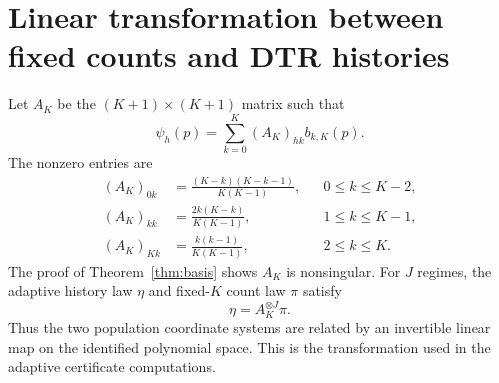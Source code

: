 \documentclass[11pt]{article}
\theoremstyle{remark}
\begin{document}
\appendix
\section{Linear transformation between fixed counts and DTR histories}

Let $A_K$ be the $(K+1)\times(K+1)$ matrix such that
\[
 \psi_h(p)=\sum_{k=0}^K (A_K)_{hk}b_{k,K}(p).
\]
The nonzero entries are
\begin{align*}
(A_K)_{0k}&=\frac{(K-k)(K-k-1)}{K(K-1)}, &&0\le k\le K-2,\\
(A_K)_{kk}&=\frac{2k(K-k)}{K(K-1)}, &&1\le k\le K-1,\\
(A_K)_{Kk}&=\frac{k(k-1)}{K(K-1)}, &&2\le k\le K.
\end{align*}
The proof of Theorem~\ref{thm:basis} shows $A_K$ is nonsingular. For $J$ regimes, the adaptive history law $\eta$ and fixed-$K$ count law $\pi$ satisfy
\[
 \eta=A_K^{\otimes J}\pi.
\]
Thus the two population coordinate systems are related by an invertible linear map on the identified polynomial space. This is the transformation used in the adaptive certificate computations.



\end{document}
